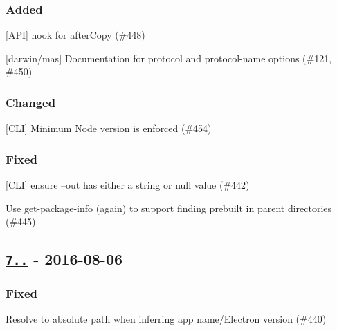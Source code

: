 \subsubsection*{Added}


\begin{DoxyItemize}
\item \mbox{[}A\+PI\mbox{]} hook for after\+Copy (\#448)
\item \mbox{[}darwin/mas\mbox{]} Documentation for {\ttfamily protocol} and {\ttfamily protocol-\/name} options (\#121, \#450)
\end{DoxyItemize}

\subsubsection*{Changed}


\begin{DoxyItemize}
\item \mbox{[}C\+LI\mbox{]} Minimum \mbox{\hyperlink{classNode}{Node}} version is enforced (\#454)
\end{DoxyItemize}

\subsubsection*{Fixed}


\begin{DoxyItemize}
\item \mbox{[}C\+LI\mbox{]} ensure --out has either a string or null value (\#442)
\item Use {\ttfamily get-\/package-\/info} (again) to support finding prebuilt in parent directories (\#445)
\end{DoxyItemize}

\subsection*{\href{https://github.com/electron-userland/electron-packager/compare/v7.5.0...v7.5.1}{\tt 7..} -\/ 2016-\/08-\/06}

\subsubsection*{Fixed}


\begin{DoxyItemize}
\item Resolve to absolute path when inferring app name/\+Electron version (\#440)
\end{DoxyItemize}

